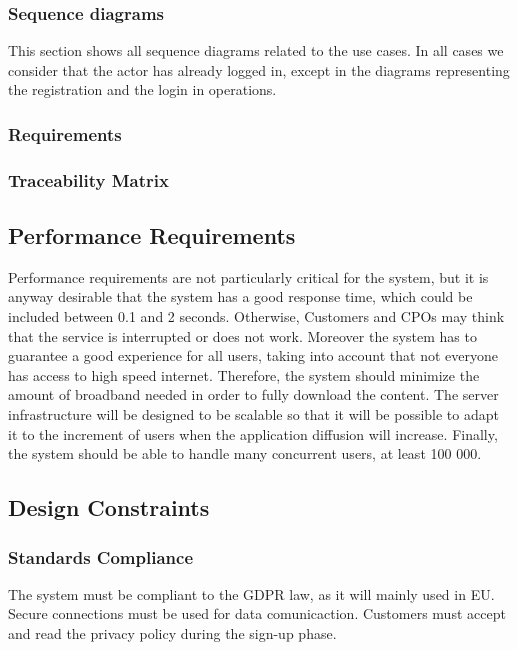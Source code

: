 \subsubsection{Sequence diagrams}
This section shows all sequence diagrams related to the use cases. In all cases we consider that the actor has already logged in, except in the diagrams representing the registration and the login in operations.




\subsubsection{Requirements}
\subsubsection{Traceability Matrix}
\subsection{Performance Requirements}

Performance requirements are not particularly critical for the system, but it is anyway desirable that the system has a good response time, which could be included between 0.1 and 2 seconds.
Otherwise, Customers and CPOs may think that the service is interrupted or does not work.
Moreover the system has to guarantee a good experience for all users, taking into account that not everyone has access to high speed internet. Therefore,
the system should minimize the amount of broadband needed in order to fully
download the content.
The server infrastructure will be designed to be scalable so that it will be possible to adapt it to
the increment of users when the application diffusion will increase.
Finally, the system should be able to handle many concurrent users, at least
100 000.
\subsection{Design Constraints}
\subsubsection{Standards Compliance}

The system must be compliant to the GDPR law, as it will mainly used in EU. \newline
Secure connections must be used for data comunicaction. \newline
Customers must accept and read the privacy policy during the sign-up phase. \newline


